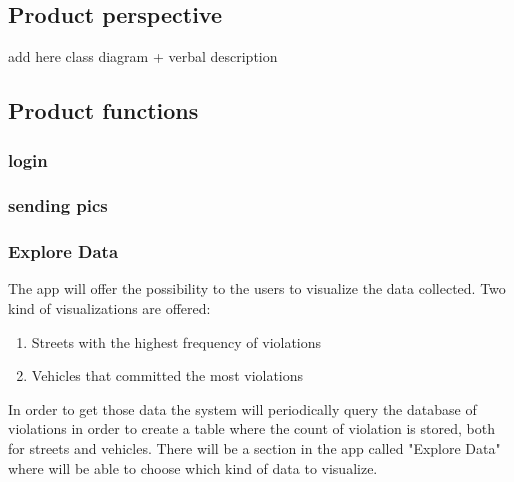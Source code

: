 



\subsection{Product perspective }


add here class diagram + verbal description





\subsection{Product functions}

\subsubsection{login }
\subsubsection{sending pics}
\subsubsection{Explore Data}
The app will offer the possibility to the users to visualize the data collected.
Two kind of visualizations are offered:
\begin{enumerate}
  \item Streets with the highest frequency of violations
  \item Vehicles that committed the most violations
\end{enumerate}
In order to get those data the system will periodically query the database of violations in order to create a table where the count of violation is stored, both for streets and vehicles.
There will be a section in the app called "Explore Data" where will be able to choose which kind of data to visualize.



